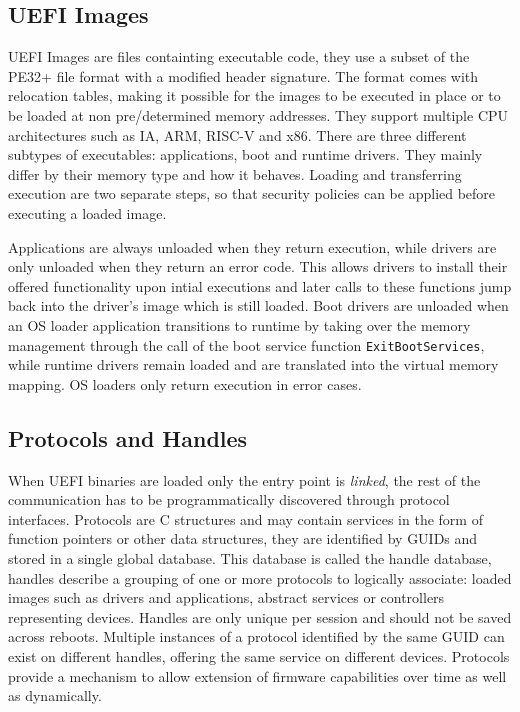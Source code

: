 \subsection{\acs{UEFI} Images}

\ac{UEFI} Images are files containting executable code, they use a subset of the \ac{PE32}+ file format with a modified header signature.
The format comes with relocation tables, making it possible for the images to be executed in place or to be loaded at non pre\-/determined memory addresses.
They support multiple CPU architectures such as IA, ARM, RISC-V and x86.
There are three different subtypes of executables: applications, boot and runtime drivers. They mainly differ by their memory type and how it behaves.
Loading and transferring execution are two separate steps, so that security policies can be applied before executing a loaded image\cite[2.1.1]{uefi-spec}.

Applications are always unloaded when they return execution, while drivers are only unloaded when they return an error code. This allows drivers to install their offered functionality upon intial executions and later calls to these functions jump back into the driver's image which is still loaded.
Boot drivers are unloaded when an \ac{OS} loader application transitions to runtime by taking over the memory management through the call of the boot service function \lstinline{ExitBootServices}, while runtime drivers remain loaded and are translated into the virtual memory mapping. \ac{OS} loaders only return execution in error cases.


\subsection{Protocols and Handles}

When \ac{UEFI} binaries are loaded only the entry point is \emph{linked}, the rest of the communication has to be programmatically discovered through protocol interfaces.
Protocols are C structures and may contain services in the form of function pointers or other data structures, they are identified by \acp{GUID} and stored in a single global database\cite{beyond-bios}.
This database is called the handle database, handles describe a grouping of one or more protocols to logically associate\cite[3.6]{tianocore-edk2-driver-writer-s-guide}: loaded images such as drivers and applications, abstract services or controllers representing devices\cite[3.4]{tianocore-edk2-driver-writer-s-guide}.
Handles are only unique per session and should not be saved across reboots\cite{beyond-bios}.
Multiple instances of a protocol identified by the same \ac{GUID} can exist on different handles, offering the same service on different devices.
Protocols provide a mechanism to allow extension of firmware capabilities over time as well as dynamically\cite[3.6]{tianocore-edk2-driver-writer-s-guide}.

